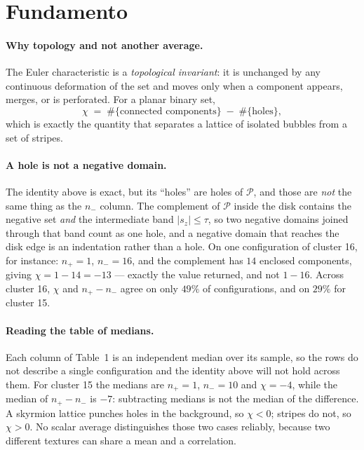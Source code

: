 \documentclass[11pt,a4paper]{article}
\begin{document}
\section{Fundamento}

\paragraph{Why topology and not another average.}
The Euler characteristic is a \emph{topological invariant}: it is unchanged by any
continuous deformation of the set and moves only when a component appears, merges, or is
perforated. For a planar binary set,
\[
  \chi \;=\; \#\{\text{connected components}\} \;-\; \#\{\text{holes}\},
\]
which is exactly the quantity that separates a lattice of isolated bubbles from a set of
stripes.

\paragraph{A hole is not a negative domain.} The identity above is exact, but its
``holes'' are holes of $\mathcal{P}$, and those are \emph{not} the same thing as the
$n_-$ column. The complement of $\mathcal{P}$ inside the disk contains the negative set
\emph{and} the intermediate band $|s_z|\le\tau$, so two negative domains joined through
that band count as one hole, and a negative domain that reaches the disk edge is an
indentation rather than a hole. On one configuration of cluster 16, for instance:
$n_+=1$, $n_-=16$, and the complement has $14$ enclosed components, giving
$\chi = 1-14 = -13$ --- exactly the value returned, and not $1-16$. Across cluster 16,
$\chi$ and $n_+-n_-$ agree on only $49\%$ of configurations, and on $29\%$ for cluster 15.

\paragraph{Reading the table of medians.} Each column of Table~1 is an independent median
over its sample, so the rows do not describe a single configuration and the identity above
will not hold across them. For cluster 15 the medians are $n_+=1$, $n_-=10$ and $\chi=-4$,
while the median of $n_+-n_-$ is $-7$: subtracting medians is not the median of the
difference. A skyrmion lattice punches holes in the background, so $\chi<0$; stripes do not,
so $\chi>0$. No scalar average distinguishes those two cases reliably, because two
different textures can share a mean and a correlation.
\end{document}
